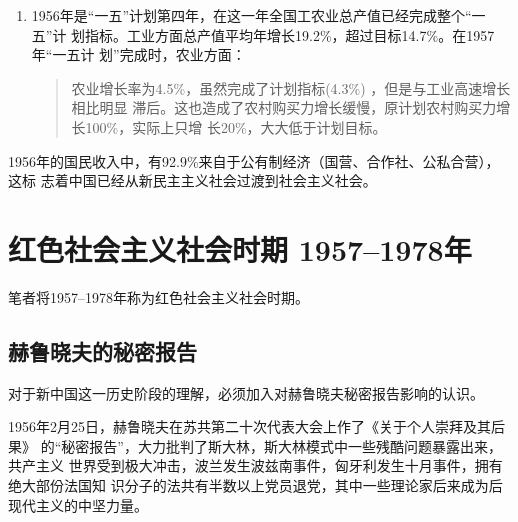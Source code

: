 \begin{enumerate}



\item 1956年是“一五”计划第四年，在这一年全国工农业总产值已经完成整个“一五”计
  划指标。工业方面总产值平均年增长19.2\%，超过目标14.7\%。在1957年“一五计
  划”完成时，农业方面：
  \begin{quotation}
    农业增长率为4.5\%，虽然完成了计划指标(4.3\%) ，但是与工业高速增长相比明显
    滞后。这也造成了农村购买力增长缓慢，原计划农村购买力增长100\%，实际上只增
    长20\%，大大低于计划目标。\cite{shiyiwu}
  \end{quotation}

\end{enumerate}

1956年的国民收入中，有92.9\%来自于公有制经济（国营、合作社、公私合营），这标
志着中国已经从新民主主义社会过渡到社会主义社会。

\section{红色社会主义社会时期 1957--1978年}


笔者将1957--1978年称为红色社会主义社会时期。

\subsection{赫鲁晓夫的秘密报告}

对于新中国这一历史阶段的理解，必须加入对赫鲁晓夫秘密报告影响的认识。

1956年2月25日，赫鲁晓夫在苏共第二十次代表大会上作了《关于个人崇拜及其后果》
的“秘密报告”，大力批判了斯大林，斯大林模式中一些残酷问题暴露出来，共产主义
世界受到极大冲击，波兰发生波兹南事件，匈牙利发生十月事件，拥有绝大部份法国知
识分子的法共有半数以上党员退党，其中一些理论家后来成为后现代主义的中坚力量。

